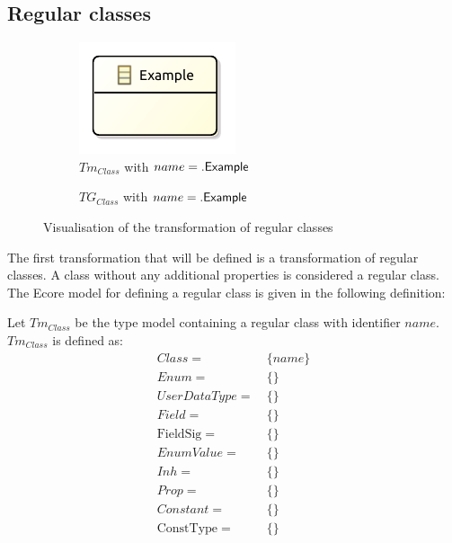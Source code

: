 \subsection{Regular classes}
\label{subsec:library_of_transformations:type_level_transformations:regular_classes}

\begin{figure}
    \centering
    \begin{subfigure}{0.45\textwidth}
        \centering
        \includegraphics{images/05_library_of_transformations/02_type_level_transformations/01_regular_classes/class_type.pdf}
        \caption{$Tm_{Class}$ with $name = .\mathsf{Example}$}
        \label{fig:library_of_transformations:type_level_transformations:regular_classes:visualisation:ecore}
    \end{subfigure}
    \begin{subfigure}{0.45\textwidth}
        \centering
        
        \caption{$TG_{Class}$ with $name = .\mathsf{Example}$}
        \label{fig:library_of_transformations:type_level_transformations:regular_classes:visualisation:groove}
    \end{subfigure}
    \caption{Visualisation of the transformation of regular classes}
    \label{fig:library_of_transformations:type_level_transformations:regular_classes:visualisation}
\end{figure}

The first transformation that will be defined is a transformation of regular classes. A class without any additional properties is considered a regular class. The Ecore model for defining a regular class is given in the following definition:

\begin{defin}
\label{defin:library_of_transformations:type_level_transformations:regular_classes:tmod_class}
Let $Tm_{Class}$ be the type model containing a regular class with identifier $name$. $Tm_{Class}$ is defined as:
\begin{align*}
Class =\ &\{name\} \\
Enum =\ &\{\} \\
UserDataType =\ &\{\} \\
Field =\ &\{\} \\
\mathrm{FieldSig} =\ &\{\} \\
EnumValue =\ &\{\} \\
Inh =\ &\{\} \\
Prop =\ &\{\} \\
Constant =\ &\{\} \\
\mathrm{ConstType} =\ &\{\}
\end{align*}
\end{defin}

